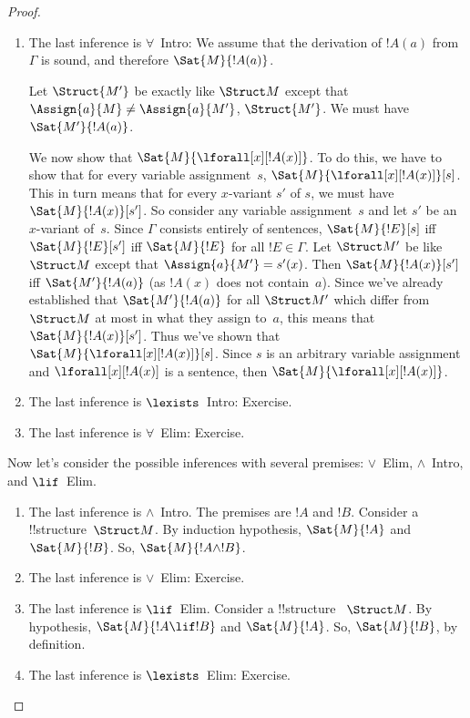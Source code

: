 \documentclass[../../include/open-logic-section]{subfiles}
\begin{document}
\begin{proof}
\begin{enumerate}
\item The last inference is $\forall$~Intro: We assume that the derivation of
$!A(a)$ from $\Gamma$ is sound, and therefore $\Sat{M}{!A(a)}$.

  Let $\Struct{M'}$ be exactly like $\Struct M$ except that
  $\Assign{a}{M} \neq \Assign{a}{M'}$, $\Struct{M'}$. We
  must have $\Sat{M'}{!A(a)}$.

  We now show that $\Sat{M}{\lforall[x][!A(x)]}$.  To do this, we have
  to show that for every variable assignment~$s$,
  $\Sat{M}{\lforall[x][!A(x)]}[s]$.  This in turn means that for every
  $x$-variant $s'$ of $s$, we must have $\Sat{M}{!A(x)}[s']$.  So
  consider any variable assignment~$s$ and let $s'$ be an $x$-variant
  of~$s$.  Since $\Gamma$ consists entirely of sentences,
  $\Sat{M}{!E}[s]$ iff $\Sat{M}{!E}[s']$ iff $\Sat{M}{!E}$ for all
  $!E \in \Gamma$.  Let $\Struct M'$ be like $\Struct M$
  except that $\Assign{a}{M'} = s'(x)$.  Then $\Sat{M}{!A(x)}[s']$ iff
  $\Sat{M'}{!A(a)}$ (as $!A(x)$ does not contain~$a$).  Since we've
  already established that $\Sat{M'}{!A(a)}$ for all $\Struct M'$
  which differ from $\Struct M$ at most in what they assign to~$a$,
  this means that $\Sat{M}{!A(x)}[s']$.  Thus we've shown that
  $\Sat{M}{\lforall[x][!A(x)]}[s]$.  Since $s$ is an arbitrary variable
  assignment and $\lforall[x][!A(x)]$ is a sentence, then
  $\Sat{M}{\lforall[x][!A(x)]}$.

  
\item The last inference is $\lexists$~Intro: Exercise.

\item The last inference is $\forall$~Elim: Exercise.


\end{enumerate}
Now let's consider the possible inferences with several premises:
$\lor$~Elim, $\land$~Intro, and $\lif$~Elim.
\begin{enumerate}

\item The last inference is $\land$~Intro.  The premises are $!A$
  and $!B$. Consider a !!{structure}~$\Struct M$. By induction 
  hypothesis, $\Sat{M}{!A}$ and $\Sat{M}{!B}$. So, $\Sat{M}
  {!A \land !B}$.
  
\item The last inference is $\lor$~Elim: Exercise.

\item The last inference is $\lif$~Elim. Consider a !!{structure}
~$\Struct M$. By hypothesis, $\Sat{M}{!A \lif !B}$ and $\Sat{M}{!A}$. 
 So, $\Sat{M}{!B}$, by definition.
    
\item The last inference is $\lexists$~Elim: Exercise.
\end{enumerate}
\end{proof}
\end{document}
